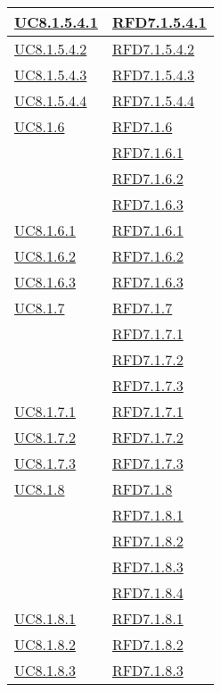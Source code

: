 \begin{longtable}{|>{\centering}m{5cm}|m{5cm}<{\centering}|}
\hyperref[UC8.1.5.4.1]{UC8.1.5.4.1} & \hyperlink{RFD7.1.5.4.1}{RFD7.1.5.4.1}\\ \hline
\hyperref[UC8.1.5.4.2]{UC8.1.5.4.2} & \hyperlink{RFD7.1.5.4.2}{RFD7.1.5.4.2}\\ \hline
\hyperref[UC8.1.5.4.3]{UC8.1.5.4.3} & \hyperlink{RFD7.1.5.4.3}{RFD7.1.5.4.3}\\ \hline
\hyperref[UC8.1.5.4.4]{UC8.1.5.4.4} & \hyperlink{RFD7.1.5.4.4}{RFD7.1.5.4.4}\\ \hline
\hyperref[UC8.1.6]{UC8.1.6} & \hyperlink{RFD7.1.6}{RFD7.1.6}\\
& \hyperlink{RFD7.1.6.1}{RFD7.1.6.1}\\
& \hyperlink{RFD7.1.6.2}{RFD7.1.6.2}\\
& \hyperlink{RFD7.1.6.3}{RFD7.1.6.3}\\ \hline
\hyperref[UC8.1.6.1]{UC8.1.6.1} & \hyperlink{RFD7.1.6.1}{RFD7.1.6.1}\\ \hline
\hyperref[UC8.1.6.2]{UC8.1.6.2} & \hyperlink{RFD7.1.6.2}{RFD7.1.6.2}\\ \hline
\hyperref[UC8.1.6.3]{UC8.1.6.3} & \hyperlink{RFD7.1.6.3}{RFD7.1.6.3}\\ \hline
\hyperref[UC8.1.7]{UC8.1.7} & \hyperlink{RFD7.1.7}{RFD7.1.7}\\
& \hyperlink{RFD7.1.7.1}{RFD7.1.7.1}\\
& \hyperlink{RFD7.1.7.2}{RFD7.1.7.2}\\
& \hyperlink{RFD7.1.7.3}{RFD7.1.7.3}\\ \hline
\hyperref[UC8.1.7.1]{UC8.1.7.1} & \hyperlink{RFD7.1.7.1}{RFD7.1.7.1}\\ \hline
\hyperref[UC8.1.7.2]{UC8.1.7.2} & \hyperlink{RFD7.1.7.2}{RFD7.1.7.2}\\ \hline
\hyperref[UC8.1.7.3]{UC8.1.7.3} & \hyperlink{RFD7.1.7.3}{RFD7.1.7.3}\\ \hline
\hyperref[UC8.1.8]{UC8.1.8} & \hyperlink{RFD7.1.8}{RFD7.1.8}\\
& \hyperlink{RFD7.1.8.1}{RFD7.1.8.1}\\
& \hyperlink{RFD7.1.8.2}{RFD7.1.8.2}\\
& \hyperlink{RFD7.1.8.3}{RFD7.1.8.3}\\
& \hyperlink{RFD7.1.8.4}{RFD7.1.8.4}\\ \hline
\hyperref[UC8.1.8.1]{UC8.1.8.1} & \hyperlink{RFD7.1.8.1}{RFD7.1.8.1}\\ \hline
\hyperref[UC8.1.8.2]{UC8.1.8.2} & \hyperlink{RFD7.1.8.2}{RFD7.1.8.2}\\ \hline
\hyperref[UC8.1.8.3]{UC8.1.8.3} & \hyperlink{RFD7.1.8.3}{RFD7.1.8.3}\\ \hline

\end{longtable}
